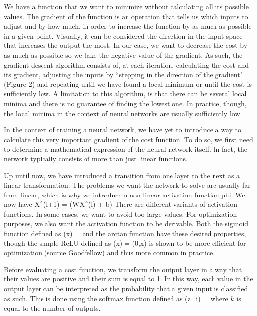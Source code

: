 \startsubsection[title=Optimization using gradient descent]
We have a function that we want to minimize without calculating all its possible values. 
The gradient of the function is an operation that tells us which inputs to adjust and by how much, in order to increase the function by as much as possible in a given point. 
Visually, it can be considered the direction in the input space that increases the output the most. 
In our case, we want to decrease the cost by as much as possible so we take the negative value of the gradient. 
As such, the gradient descent algorithm consists of, at each iteration, calculating the cost and its gradient, adjusting the inputs by “stepping in the direction of the gradient" (Figure 2) and repeating until we have found a local minimum or until the cost is sufficiently low. 
A limitation to this algorithm, is that there can be several local minima and there is no guarantee of finding the lowest one. 
In practice, though, the local minima in the context of neural networks are usually sufficiently low. 

In the context of training a neural network, we have yet to introduce a way to calculate this very important gradient of the cost function. 
To do so, we first need to determine a mathematical expression of the neural network itself. 
In fact, the network typically consists of more than just linear functions.
 
\stopsubsection
 

\startsubsection[title=Activation function] 
Up until now, we have introduced a transition from one layer to the next as a linear transformation. 
The problems we want the network to solve are usually far from linear, which is why we introduce a non-linear activation function phi. We now have
\startformula
X^{(l+1)} = \phi(WX^{(l)} + b)
\stopformula
There are different variants of activation functions. In some cases, we want to avoid too large values.  
For optimization purposes, we also want the activation function to be derivable. 
Both the sigmoid function defined as 
\startformula
\phi(x) = 
\stopformula
and the arctan function have these desired properties, though the simple ReLU defined as 
\startformula
\phi(x) = \max(0,x) 
\stopformula
is shown to be more efficient for optimization (source Goodfellow) and thus more common in practice.

\stopsubsection

\startsubsection[title=Softmax, loss and cost function ]
Before evaluating a cost function, we transform the output layer in a way that their values are positive and their sum is equal to 1. 
In this way, each value in the output layer can be interpreted as the probability that a given input is classified as such.
This is done using the softmax function defined as
\startformula
\sigma(z_i) =  
\stopformula
where $k$ is equal to the number of outputs. 
 
